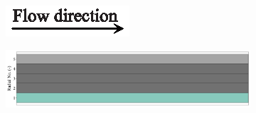 \documentclass[preprint,12pt]{elsarticle}
\begin{document}
\begin{figure}[h!]
     \centering
     \begin{subfigure}[b]{0.95\textwidth}
     	\includegraphics[width=\textwidth]{flow_dir.eps}
     \end{subfigure}
     \begin{subfigure}[b]{0.85\textwidth}
\includegraphics[width=\textwidth]{results/segments/5seg/40C60T/seg.png}
     \end{subfigure}
     \hfill
     \begin{subfigure}[b]{0.1\textwidth}

\end{subfigure}
\end{figure}
\end{document}

